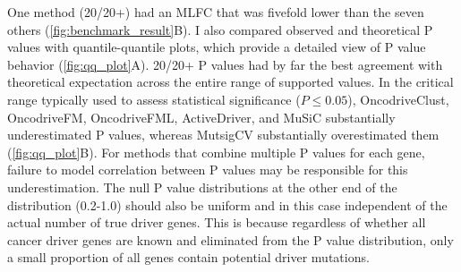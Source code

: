 One method (20/20+) had an MLFC that was fivefold lower than the seven others (\autoref{fig:benchmark_result}B). I also compared observed and theoretical P values with quantile-quantile plots, which provide a detailed view of P value behavior (\autoref{fig:qq_plot}A). 20/20+ P values had by far the best agreement with theoretical expectation across the entire range of supported values. In the critical range typically used to assess statistical significance ($P \leq 0.05$), OncodriveClust, OncodriveFM, OncodriveFML, ActiveDriver, and MuSiC substantially underestimated P values, whereas MutsigCV substantially overestimated them (\autoref{fig:qq_plot}B). For methods that combine multiple P values for each gene, failure to model correlation between P values may be responsible for this underestimation. The null P value distributions at the other end of the distribution (0.2-1.0) should also be uniform and in this case independent of the actual number of true driver genes. This is because regardless of whether all cancer driver genes are known and eliminated from the P value distribution, only a small proportion of all genes contain potential driver mutations.

